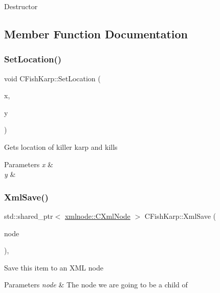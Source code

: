 Destructor 

\subsection{Member Function Documentation}
\mbox{\label{class_c_fish_karp_ad16715dc334ff9bbb96906463c67efe1}} 
\subsubsection{\texorpdfstring{Set\+Location()}{SetLocation()}}
{\footnotesize\ttfamily void C\+Fish\+Karp\+::\+Set\+Location (\begin{DoxyParamCaption}\item[{double}]{x,  }\item[{double}]{y }\end{DoxyParamCaption})\hspace{0.3cm}{\ttfamily [virtual]}}

Gets location of killer karp and kills 
\begin{DoxyParams}{Parameters}
{\em x} & \\
\hline
{\em y} & \\
\hline
\end{DoxyParams}
\mbox{\label{class_c_fish_karp_a182d8cce606be73a981bd140aca64ba8}} 
\subsubsection{\texorpdfstring{Xml\+Save()}{XmlSave()}}
{\footnotesize\ttfamily std\+::shared\+\_\+ptr$<$ \mbox{\hyperlink{classxmlnode_1_1_c_xml_node}{xmlnode\+::\+C\+Xml\+Node}} $>$ C\+Fish\+Karp\+::\+Xml\+Save (\begin{DoxyParamCaption}\item[{const std\+::shared\+\_\+ptr$<$ \mbox{\hyperlink{classxmlnode_1_1_c_xml_node}{xmlnode\+::\+C\+Xml\+Node}} $>$ \&}]{node }\end{DoxyParamCaption})\hspace{0.3cm}{\ttfamily [override]}, {\ttfamily [virtual]}}

Save this item to an X\+ML node 
\begin{DoxyParams}{Parameters}
{\em node} & The node we are going to be a child of \\
\hline
\end{DoxyParams}


